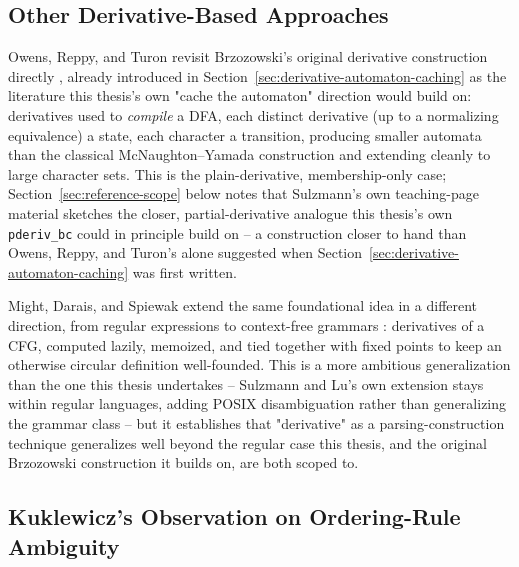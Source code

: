 \subsection{Other Derivative-Based Approaches}
\label{sec:other-derivative-work}

Owens, Reppy, and Turon revisit Brzozowski's original derivative
construction directly \citep{owens2009}, already introduced in
Section~\ref{sec:derivative-automaton-caching} as the literature this
thesis's own "cache the automaton" direction would build on: derivatives
used to \emph{compile} a DFA, each distinct derivative (up to a
normalizing equivalence) a state, each character a transition, producing
smaller automata than the classical McNaughton--Yamada construction and
extending cleanly to large character sets. This is the plain-derivative,
membership-only case; Section~\ref{sec:reference-scope} below notes that
Sulzmann's own teaching-page material \citep{sulzmann_slides} sketches
the closer, partial-derivative analogue this thesis's own
\texttt{pderiv\_bc} could in principle build on -- a construction closer
to hand than Owens, Reppy, and Turon's alone suggested when
Section~\ref{sec:derivative-automaton-caching} was first written.

Might, Darais, and Spiewak extend the same foundational idea in a
different direction, from regular expressions to context-free grammars
\citep{mightdaraisspiewak2011}: derivatives of a CFG, computed lazily,
memoized, and tied together with fixed points to keep an otherwise
circular definition well-founded. This is a more ambitious generalization
than the one this thesis undertakes -- Sulzmann and Lu's own extension
\citep{sulzmannlu2014} stays within regular languages, adding POSIX
disambiguation rather than generalizing the grammar class -- but it
establishes that "derivative" as a parsing-construction technique
generalizes well beyond the regular case this thesis, and the original
Brzozowski construction it builds on, are both scoped to.

\subsection{Kuklewicz's Observation on Ordering-Rule Ambiguity}
\label{sec:kuklewicz-observation}


